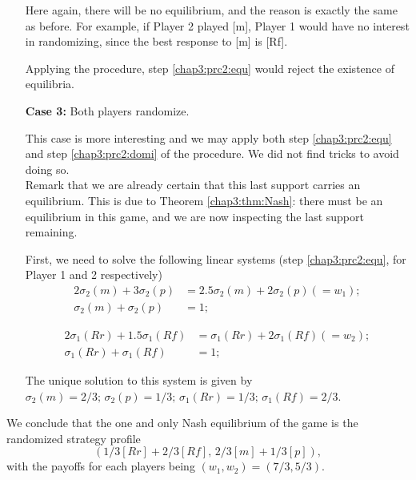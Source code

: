 \begin{example}
\begin{itemize}
Here again, there will be no equilibrium, and the reason is exactly the same as before.
For example, if Player 2 played [m], Player 1 would have no interest in randomizing, since the best response to [m] is [Rf].

Applying the procedure, step \ref{chap3:prc2:equ} would reject the existence of equilibria.

\item[\textbf{Case 3:}] Both players randomize.

This case is more interesting and we may apply both step \ref{chap3:prc2:equ} and step \ref{chap3:prc2:domi} of the procedure. We did not find tricks to avoid doing so.\\
Remark that we are already certain that this last support carries an equilibrium. This is due to Theorem \ref{chap3:thm:Nash}: there must be an equilibrium in this game, and we are now inspecting the last support remaining.

First, we need to solve the following linear systems (step \ref{chap3:prc2:equ}, for Player 1 and 2 respectively)
\begin{equation}
\begin{aligned}
 2 \sigma_2(m) + 3 \sigma_2(p) & = 2.5 \sigma_2(m) + 2 \sigma_2(p) (= w_1); \\
 \sigma_2(m) + \sigma_2(p) & = 1;
\end{aligned}
\end{equation}

\begin{equation}
\begin{aligned}
2 \sigma_1(Rr) + 1.5 \sigma_1(Rf) & = \sigma_1(Rr) + 2 \sigma_1(Rf) (=w_2); \\
\sigma_1(Rr) + \sigma_1(Rf)&  = 1;
\end{aligned}
\end{equation}

The unique solution to this system is given by $\sigma_2(m) = 2/3; \, \sigma_2(p) = 1/3; \, \sigma_1(Rr) = 1/3; \, \sigma_1(Rf) = 2/3$.
\end{itemize}
We conclude that the one and only Nash equilibrium of the game is the randomized strategy profile
$$(1/3 [Rr] + 2/3 [Rf], \, 2/3 [m] + 1/3 [p]), $$
with the payoffs for each players being $(w_1, w_2) = (7/3, 5/3). $

\label{chap3:ex:cardgame}
\end{example}


